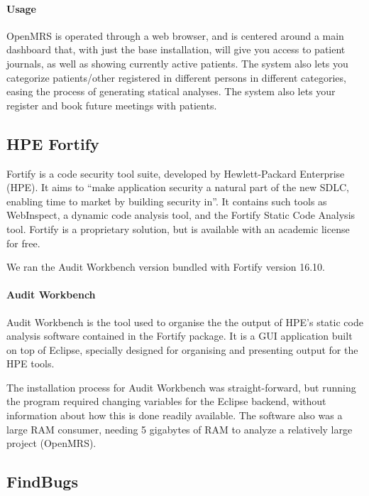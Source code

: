\documentclass{report} %
\begin{document}
  

  \paragraph{Usage}

  OpenMRS is operated through a web browser, and is centered around a main dashboard that,
  with just the base installation, will give you access to patient journals, as well as
  showing currently active patients. The system also lets you categorize patients/other registered
  in different persons in different categories, easing the process of generating statical analyses.
  The system also lets your register and book future meetings with patients.

\subsection{HPE Fortify}

  Fortify is a code security tool suite, developed by Hewlett-Packard
  Enterprise (HPE). It aims to ``make application security a natural part of the new
  SDLC, enabling time to market by building security in''\autocite[]{Fortify}.
  It contains such tools as WebInspect, a dynamic code analysis tool, and the
  Fortify Static Code Analysis tool. Fortify is a proprietary solution, but is
  available with an academic license for free.

  We ran the Audit Workbench version bundled with Fortify version 16.10.

\paragraph{Audit Workbench}

  Audit Workbench is the tool used to organise the the output of HPE's static
  code analysis software contained in the Fortify package. It is a GUI
  application built on top of Eclipse, specially designed for organising and
  presenting output for the HPE tools. 
  
  The installation process for Audit Workbench was straight-forward, but running
  the program required changing variables for the Eclipse backend, without
  information about how this is done readily available. The software also was a
  large RAM consumer, needing 5 gigabytes of RAM to analyze a relatively large
  project (OpenMRS).

\subsection{FindBugs}
\end{document}
